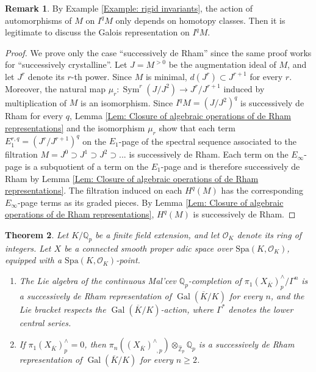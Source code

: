 \documentclass[11pt]{amsart}
\newtheorem{theorem}{Theorem}[section]
\theoremstyle{definition}
\newtheorem{remark}[theorem]{Remark}
\numberwithin{equation}{section}
\numberwithin{equation}{section}
\newcommand\QQ{\mathbb{Q}}
\newcommand\ZZ{\mathbb{Z}}
\newcommand\OO{\mathcal{O}}
\DeclareMathOperator{\et}{\acute{e}t}
\DeclareMathOperator{\Sym}{Sym}
\DeclareMathOperator{\Gal}{Gal}
\begin{document}
\begin{remark}
By Example \ref{Example: rigid invariants}, the action of automorphisms of $M$ on $I^qM$ only depends on homotopy classes. Then it is legitimate to discuss the Galois representation on  $I^qM$.
\end{remark}

\begin{proof}
We prove only the case ``successively de Rham'' since the same proof works for ``successively crystalline''. 
Let $J=M^{>0}$ be the augmentation ideal of $M$, and let $J^r$ denote its $r$-th power.  Since $M$ is minimal, $d(J^r)\subset J^{r+1}$ for every $r$. Moreover, the natural map $\mu_r:\Sym^r(J/J^2)\rightarrow J^r/J^{r+1}$ induced by multiplication of $M$ is an isomorphism. Since $I^qM=(J/J^2)^q$ is successively de Rham for every $q$, Lemma \ref{Lem: Closure of algebraic operations of de Rham representations} and the isomorphism $\mu_r$ show that each term $E^{r,q}_1=(J^r/J^{r+1})^q$ on the $E_1$-page of the spectral sequence associated to the filtration $M=J^0\supset J^1\supset J^2\supset ...$  is successively de Rham. Each term on the $E_{\infty}$-page
is a subquotient of a term on the $E_1$-page and is therefore successively de Rham by Lemma \ref{Lem: Closure of algebraic operations of de Rham representations}.  The filtration induced on each $H^q(M)$ has the corresponding $E_{\infty}$-page terms as its graded pieces. By Lemma \ref{Lem: Closure of algebraic operations of de Rham representations}, $H^q(M)$ is successively de Rham.
\end{proof}

\begin{theorem}\label{Thm: de Rham represenations for etale homotopy groups}
Let $K/\QQ_p$ be a finite field extension, and let $\mathcal{O}_{K}$ denote its ring of integers. Let $X$ be a connected smooth proper adic space over $\mathrm{Spa}(K,\OO_K)$, equipped with a $\mathrm{Spa}(K,\OO_K)$-point. 
\begin{enumerate}[leftmargin=0.25in]
    \item The Lie algebra of the continuous Mal'cev $\QQ_p$-completion of $\pi^{\et}_1(X_{\overline{K}})^{\wedge}_{p}/\Gamma^n$ is a successively de Rham representation of $\Gal(\overline{K}/K)$ for every $n$, and the Lie bracket respects the $\Gal(\overline{K}/K)$-action, where $\Gamma^*$ denotes the lower central series.
    \item If $\pi^{\et}_1(X_{\overline{K}})^{\wedge}_{p}=0$, then $\pi_n((X_{\overline{K}})^{\wedge}_{\et,p})\otimes_{\widehat{\ZZ}_{p}}\QQ_{p}$ is a successively de Rham representation of $\Gal(\overline{K}/K)$ for every $n\geq 2$.
\end{enumerate}
\end{theorem}
\end{document}
